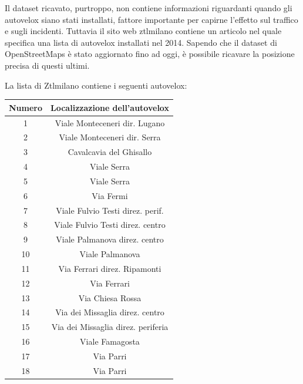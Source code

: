 \documentclass[a4paper,12pt]{report}
\begin{document}


Il dataset ricavato, purtroppo, non contiene informazioni riguardanti quando gli 
autovelox siano stati installati, fattore importante per capirne l'effetto 
sul traffico e sugli incidenti.
Tuttavia il sito web ztlmilano \cite{ZTLMILANO:1}
contiene un articolo nel quale specifica una lista di 
autovelox installati nel 2014. 
Sapendo che il dataset di OpenStreetMaps è stato aggiornato fino ad oggi, 
è possibile ricavare la posizione precisa di questi ultimi.

La lista di Ztlmilano contiene i seguenti autovelox: 

\begin{center}
    \def\arraystretch{1.5}%
    \begin{tabular}{ |c|c| } 
    \hline
    Numero & Localizzazione dell'autovelox \\ 
    \hline
    \rowcolor{TableGray}
    1   &   Viale Monteceneri  dir. Lugano\\
    2   &   Viale Monteceneri dir. Serra\\
    \rowcolor{TableGray}
    3   &   Cavalcavia del Ghisallo\\
    4   &   Viale Serra \\
    \rowcolor{TableGray}
    5   &   Viale Serra\\
    6   &   Via Fermi\\
    \rowcolor{TableGray}
    7   &   Viale Fulvio Testi direz. perif.\\
    8   &   Viale Fulvio Testi direz. centro\\
    \rowcolor{TableGray}
    9   &   Viale Palmanova  direz. centro\\
    10  &   Viale Palmanova\\
    \rowcolor{TableGray}
    11  &   Via Ferrari direz. Ripamonti\\
    12  &   Via Ferrari\\
    \rowcolor{TableGray}
    13  &   Via Chiesa Rossa\\
    14  &   Via dei Missaglia direz. centro\\
    \rowcolor{TableGray}
    15  &   Via dei Missaglia direz. periferia\\
    16  &   Viale Famagosta\\
    \rowcolor{TableGray}
    17  &   Via Parri\\
    18  &   Via Parri\\
    \hline
    \end{tabular}
    \label{ztl-milano}
\end{center}
\end{document}
